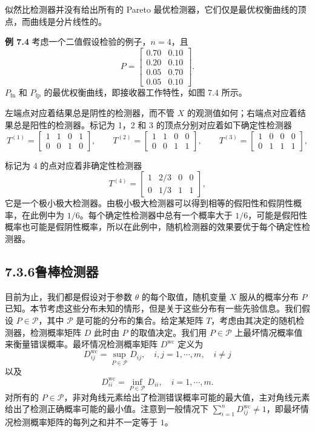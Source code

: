 \documentclass[UTF8,12pt,a4paper,fontset=fandol]{ctexart}
\begin{document}
似然比检测器并没有给出所有的 Pareto 最优检测器，它们仅是最优权衡曲线的顶点，而曲线是分片线性的。

\noindent\textbf{例 7.4}\quad
考虑一个二值假设检验的例子，$n=4$，且
\begin{equation}
P=
\begin{bmatrix}
0.70 & 0.10\\
0.20 & 0.10\\
0.05 & 0.70\\
0.05 & 0.10
\end{bmatrix}.
\tag{7.15}
\end{equation}
$P_{\mathrm{fn}}$ 和 $P_{\mathrm{fp}}$ 的最优权衡曲线，即接收器工作特性，如图 7.4 所示。

左端点对应着结果总是阴性的检测器，而不管 $X$ 的观测值如何；右端点对应着结果总是阳性的检测器。标记为 1，2 和 3 的顶点分别对应着如下确定性检测器
\[
T^{(1)}=
\begin{bmatrix}
1 & 1 & 0 & 1\\
0 & 0 & 1 & 0
\end{bmatrix},
\qquad
T^{(2)}=
\begin{bmatrix}
1 & 1 & 0 & 0\\
0 & 0 & 1 & 1
\end{bmatrix},
\qquad
T^{(3)}=
\begin{bmatrix}
1 & 0 & 0 & 0\\
0 & 1 & 1 & 1
\end{bmatrix},
\]

标记为 4 的点对应着非确定性检测器
\[
T^{(4)}=
\begin{bmatrix}
1 & 2/3 & 0 & 0\\
0 & 1/3 & 1 & 1
\end{bmatrix},
\]
它是一个极小极大检测器。由极小极大检测器可以得到相等的假阳性和假阴性概率，在此例中为 $1/6$。每个确定性检测器中总有一个概率大于 $1/6$，可能是假阳性概率也可能是假阴性概率，所以在此例中，随机检测器的效果要优于每个确定性检测器。

\subsection*{7.3.6\quad 鲁棒检测器}

目前为止，我们都是假设对于参数 $\theta$ 的每个取值，随机变量 $X$ 服从的概率分布 $P$ 已知。本节考虑这些分布未知的情形，但是关于这些分布有一些先验信息。我们假设 $P\in\mathcal{P}$，其中 $\mathcal{P}$ 是可能的分布的集合。给定某矩阵 $T$，考虑由其决定的随机检测器，检测概率矩阵 $D$ 此时由 $P$ 的取值决定。我们用 $P\in\mathcal{P}$ 上最坏情况概率值来衡量错误概率。最坏情况检测概率矩阵 $D^{\mathrm{wc}}$ 定义为
\[
D_{ij}^{\mathrm{wc}}=\sup_{P\in\mathcal{P}}D_{ij},\quad i,j=1,\cdots,m,\quad i\neq j
\]
以及
\[
D_{ii}^{\mathrm{wc}}=\inf_{P\in\mathcal{P}}D_{ii},\quad i=1,\cdots,m.
\]
对所有的 $P\in\mathcal{P}$，非对角线元素给出了检测错误概率可能的最大值，主对角线元素给出了检测正确概率可能的最小值。注意到一般情况下 $\sum_{i=1}^nD_{ij}^{\mathrm{wc}}\neq 1$，即最坏情况检测概率矩阵的每列之和并不一定等于 $1$。
\end{document}
